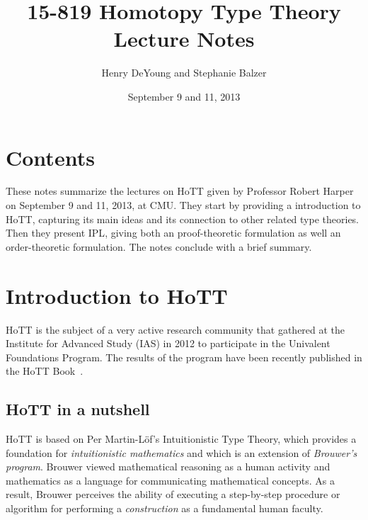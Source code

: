 \documentclass[12pt]{article}
\begin{document}
\title{15-819 Homotopy Type Theory\\ Lecture Notes}
\author{Henry DeYoung and Stephanie Balzer}
\date{September 9 and 11, 2013}

\maketitle





\section{Contents}\label{sec:contents}

These notes summarize the lectures on \ac{HoTT} given by Professor Robert
Harper on September 9 and 11, 2013, at CMU.  They start by providing a introduction to \ac{HoTT},
capturing its main ideas and its connection to other related type theories.  Then they present
\ac{IPL}, giving both an proof-theoretic formulation as
well an order-theoretic formulation.  The notes conclude with a brief summary.


\section{Introduction to \acl{HoTT}}\label{sec:intro}

\Acf{HoTT} is the subject of a very active research community that gathered at the Institute
for Advanced Study (IAS) in 2012 to participate in the Univalent Foundations Program.  The
results of the program have been recently published in the \ac{HoTT} Book~\cite{HoTTBook2013}.

\subsection{\Acs{HoTT} in a nutshell}\label{subsec:hott_in_nutshell}

\Ac{HoTT} is based on Per Martin-L\"{o}f's Intuitionistic Type Theory, which provides a
foundation for \emph{intuitionistic mathematics} and which is an extension of \emph{Brouwer's
  program}.  Brouwer viewed mathematical reasoning as a human activity and mathematics as a
language for communicating mathematical concepts.  As a result, Brouwer perceives the ability
of executing a step-by-step procedure or algorithm for performing a \emph{construction} as a
fundamental human faculty.
\end{document}
